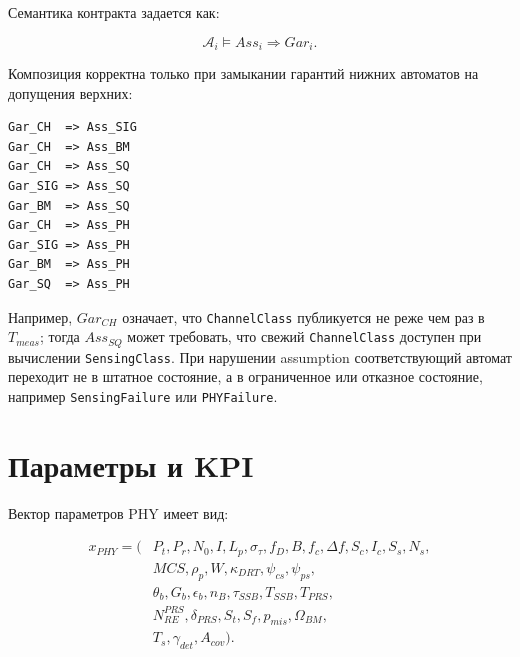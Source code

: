 \documentclass[12pt,a4paper]{article}
\begin{document}
Семантика контракта задается как:

\begin{equation}
\mathcal{A}_i\models Ass_i \Rightarrow Gar_i.
\end{equation}

Композиция корректна только при замыкании гарантий нижних автоматов на допущения верхних:

\begin{verbatim}
Gar_CH  => Ass_SIG
Gar_CH  => Ass_BM
Gar_CH  => Ass_SQ
Gar_SIG => Ass_SQ
Gar_BM  => Ass_SQ
Gar_CH  => Ass_PH
Gar_SIG => Ass_PH
Gar_BM  => Ass_PH
Gar_SQ  => Ass_PH
\end{verbatim}

Например, \(Gar_{CH}\) означает, что \texttt{ChannelClass} публикуется не реже чем раз в \(T_{meas}\); тогда \(Ass_{SQ}\) может требовать, что свежий \texttt{ChannelClass} доступен при вычислении \texttt{SensingClass}. При нарушении assumption соответствующий автомат переходит не в штатное состояние, а в ограниченное или отказное состояние, например \texttt{SensingFailure} или \texttt{PHYFailure}.

\section{Параметры и KPI}

Вектор параметров PHY имеет вид:

\begin{equation}
\begin{aligned}
x_{PHY} = (&P_t,P_r,N_0,I,L_p,\sigma_\tau,f_D,
B,f_c,\Delta f,S_c,I_c,S_s,N_s,\\
&MCS,\rho_p,W,\kappa_{DRT},
\psi_{cs},\psi_{ps},\\
&\theta_b,G_b,\epsilon_b,n_B,
\tau_{SSB},T_{SSB},T_{PRS},\\
&N_{RE}^{PRS},\delta_{PRS},S_t,S_f,
p_{mis},\Omega_{BM},\\
&T_s,\gamma_{det},A_{cov}).
\end{aligned}
\end{equation}
\end{document}
